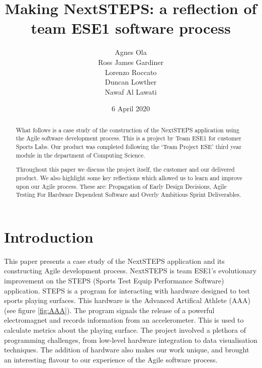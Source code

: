 \documentclass{l3proj}
\begin{document}
\title{Making NextSTEPS: a reflection of team ESE1 software process}

\author{Agnes Ola \\
        Ross James Gardiner \\
        Lorenzo Roccato \\
        Duncan Lowther \\
        Nawaf Al Lawati}

\date{6 April 2020}

\maketitle

\begin{abstract}

What follows is a case study of the construction of the NextSTEPS application using the Agile software development process. This is a project by Team ESE1 for customer Sports Labs. Our product was completed following the `Team Project ESE' third year module in the department of Computing Science. 

Throughout this paper we discuss the project itself, the customer and our delivered product. We also highlight some key reflections which allowed us to learn and improve upon our Agile process. These are: Propagation of Early Design Decisions, Agile Testing For Hardware Dependent Software and Overly Ambitious Sprint Deliverables.

\end{abstract}

\educationalconsent

\newpage
\section{Introduction}

This paper presents a case study of the NextSTEPS application and its constructing Agile development process. NextSTEPS is team ESE1's evolutionary improvement on the STEPS (Sports Test Equip Performance Software) application. STEPS is a program for interacting with hardware designed to test sports playing surfaces. This hardware is the Advanced Artifical Athlete (AAA) (see figure \ref{fig:AAA}). The program signals the release of a powerful electromagnet and records information from an accelerometer. This is used to calculate metrics about the playing surface. The project involved a plethora of programming challenges, from low-level hardware integration to data visualisation techniques. The addition of hardware also makes our work unique, and brought an interesting flavour to our experience of the Agile software process. 
\end{document}
